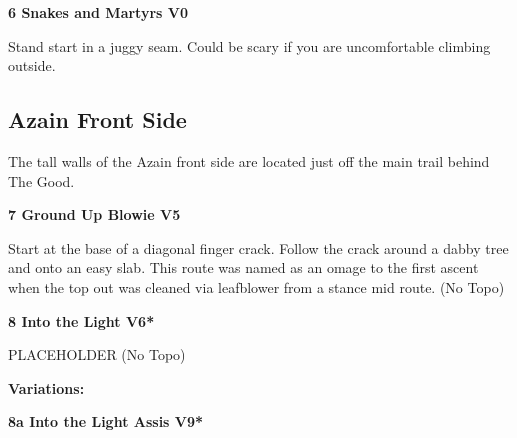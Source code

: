 \begin{multicols}{2}

					\begin{minipage}{\linewidth}	
					\label{rt:Snakes and Martyrs}
\colorbox{green!20}{
\textbf{
6 Snakes and Martyrs V0     
}
}

					\begin{adjustwidth}{0.5cm}{}				
					 Stand start in a juggy seam. Could be scary if you are uncomfortable climbing outside.
					\end{adjustwidth}
					\end{minipage}
			\subsection*{Azain Front Side}\label{bf:Azain Front Side}
			\begin{minipage}{\columnwidth}
			The tall walls of the Azain front side are located just off the main trail behind The Good.
			\end{minipage}
			
\label{pt:Ground up Blowie}
					\begin{minipage}{\linewidth}	
					\label{rt:Ground Up Blowie}
\colorbox{RoyalBlue!20}{
\textbf{
7 Ground Up Blowie V5    
}
}

					\begin{adjustwidth}{0.5cm}{}				
					Start at the base of a diagonal finger crack. Follow the crack around a dabby tree and onto an easy slab. This route was named as an omage to the first ascent when the top out was cleaned via leafblower from a stance mid route.
						\newline (No Topo) 
					\end{adjustwidth}
					\end{minipage}
					\begin{minipage}{\linewidth}	
					\label{rt:Into the Light}
\colorbox{RoyalBlue!20}{
\textbf{
8 Into the Light V6*  
}
}

					\begin{adjustwidth}{0.5cm}{}				
					PLACEHOLDER
						\newline (No Topo) 
					\end{adjustwidth}
					\end{minipage}
						\begin{adjustwidth}{0.5cm}{}				
						\textbf{Variations:} \newline
							\begin{minipage}{\linewidth}	
							\label{vr:Into the Light Assis}
\colorbox{Goldenrod!50}{
\textbf{
8a Into the Light Assis V9*  
}
}


\end{minipage}
\end{adjustwidth}
\end{multicols}
